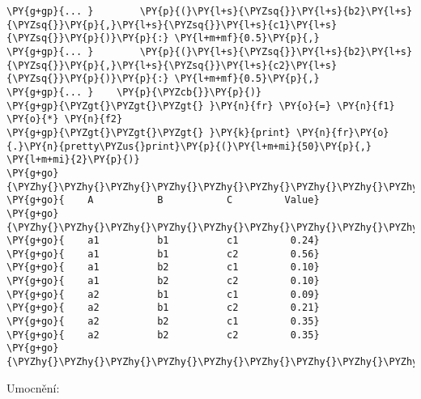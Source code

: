 \begin{fulllineitems}
\begin{Verbatim}[commandchars=\\\{\}]
\PY{g+gp}{... }        \PY{p}{(}\PY{l+s}{\PYZsq{}}\PY{l+s}{b2}\PY{l+s}{\PYZsq{}}\PY{p}{,}\PY{l+s}{\PYZsq{}}\PY{l+s}{c1}\PY{l+s}{\PYZsq{}}\PY{p}{)}\PY{p}{:} \PY{l+m+mf}{0.5}\PY{p}{,}
\PY{g+gp}{... }        \PY{p}{(}\PY{l+s}{\PYZsq{}}\PY{l+s}{b2}\PY{l+s}{\PYZsq{}}\PY{p}{,}\PY{l+s}{\PYZsq{}}\PY{l+s}{c2}\PY{l+s}{\PYZsq{}}\PY{p}{)}\PY{p}{:} \PY{l+m+mf}{0.5}\PY{p}{,}
\PY{g+gp}{... }    \PY{p}{\PYZcb{}}\PY{p}{)}
\PY{g+gp}{\PYZgt{}\PYZgt{}\PYZgt{} }\PY{n}{fr} \PY{o}{=} \PY{n}{f1} \PY{o}{*} \PY{n}{f2}
\PY{g+gp}{\PYZgt{}\PYZgt{}\PYZgt{} }\PY{k}{print} \PY{n}{fr}\PY{o}{.}\PY{n}{pretty\PYZus{}print}\PY{p}{(}\PY{l+m+mi}{50}\PY{p}{,} \PY{l+m+mi}{2}\PY{p}{)}
\PY{g+go}{\PYZhy{}\PYZhy{}\PYZhy{}\PYZhy{}\PYZhy{}\PYZhy{}\PYZhy{}\PYZhy{}\PYZhy{}\PYZhy{}\PYZhy{}\PYZhy{}\PYZhy{}\PYZhy{}\PYZhy{}\PYZhy{}\PYZhy{}\PYZhy{}\PYZhy{}\PYZhy{}\PYZhy{}\PYZhy{}\PYZhy{}\PYZhy{}\PYZhy{}\PYZhy{}\PYZhy{}\PYZhy{}\PYZhy{}\PYZhy{}\PYZhy{}\PYZhy{}\PYZhy{}\PYZhy{}\PYZhy{}\PYZhy{}\PYZhy{}\PYZhy{}\PYZhy{}\PYZhy{}\PYZhy{}\PYZhy{}\PYZhy{}\PYZhy{}\PYZhy{}\PYZhy{}\PYZhy{}\PYZhy{}\PYZhy{}\PYZhy{}}
\PY{g+go}{    A           B           C         Value}
\PY{g+go}{\PYZhy{}\PYZhy{}\PYZhy{}\PYZhy{}\PYZhy{}\PYZhy{}\PYZhy{}\PYZhy{}\PYZhy{}\PYZhy{}\PYZhy{}\PYZhy{}\PYZhy{}\PYZhy{}\PYZhy{}\PYZhy{}\PYZhy{}\PYZhy{}\PYZhy{}\PYZhy{}\PYZhy{}\PYZhy{}\PYZhy{}\PYZhy{}\PYZhy{}\PYZhy{}\PYZhy{}\PYZhy{}\PYZhy{}\PYZhy{}\PYZhy{}\PYZhy{}\PYZhy{}\PYZhy{}\PYZhy{}\PYZhy{}\PYZhy{}\PYZhy{}\PYZhy{}\PYZhy{}\PYZhy{}\PYZhy{}\PYZhy{}\PYZhy{}\PYZhy{}\PYZhy{}\PYZhy{}\PYZhy{}\PYZhy{}\PYZhy{}}
\PY{g+go}{    a1          b1          c1         0.24}
\PY{g+go}{    a1          b1          c2         0.56}
\PY{g+go}{    a1          b2          c1         0.10}
\PY{g+go}{    a1          b2          c2         0.10}
\PY{g+go}{    a2          b1          c1         0.09}
\PY{g+go}{    a2          b1          c2         0.21}
\PY{g+go}{    a2          b2          c1         0.35}
\PY{g+go}{    a2          b2          c2         0.35}
\PY{g+go}{\PYZhy{}\PYZhy{}\PYZhy{}\PYZhy{}\PYZhy{}\PYZhy{}\PYZhy{}\PYZhy{}\PYZhy{}\PYZhy{}\PYZhy{}\PYZhy{}\PYZhy{}\PYZhy{}\PYZhy{}\PYZhy{}\PYZhy{}\PYZhy{}\PYZhy{}\PYZhy{}\PYZhy{}\PYZhy{}\PYZhy{}\PYZhy{}\PYZhy{}\PYZhy{}\PYZhy{}\PYZhy{}\PYZhy{}\PYZhy{}\PYZhy{}\PYZhy{}\PYZhy{}\PYZhy{}\PYZhy{}\PYZhy{}\PYZhy{}\PYZhy{}\PYZhy{}\PYZhy{}\PYZhy{}\PYZhy{}\PYZhy{}\PYZhy{}\PYZhy{}\PYZhy{}\PYZhy{}\PYZhy{}\PYZhy{}\PYZhy{}}
\end{Verbatim}

Umocnění:


\end{fulllineitems}
